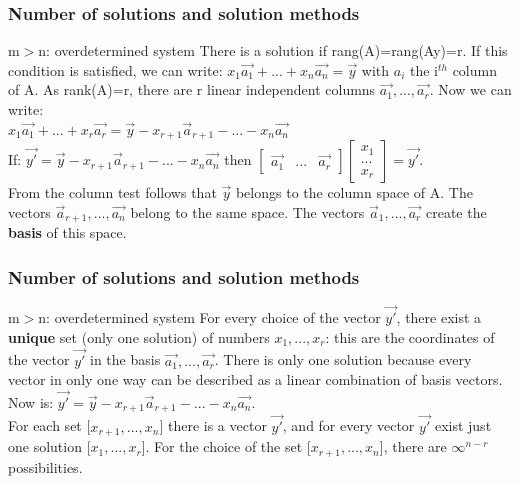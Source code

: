 \begin{frame}
	\frametitle{Number of solutions and solution methods}
	\begin{block}{m$>$n: overdetermined system}
		There is a solution if rang(A)=rang(Ay)=r. If this condition is satisfied, we can write: $x_1\overrightarrow{a_1}+...+x_n\overrightarrow{a_n}=\overrightarrow{y}$ with $a_i$ the i$^{th}$ column of A. As rank(A)=r, there are r linear independent columns
		$\overrightarrow{a_1},..., \overrightarrow{a_r}$. Now we can write: \\
		$x_1\overrightarrow{a_1}+...+x_r\overrightarrow{a_r}=\overrightarrow{y}-x_{r+1}\overrightarrow{a}_{r+1}-...-x_n\overrightarrow{a_n}$\\
		If: $\overrightarrow{y'}=\overrightarrow{y}-x_{r+1}\overrightarrow{a}_{r+1}-...-x_n\overrightarrow{a_n}$ then $\begin{bmatrix}
		\overrightarrow{a_1} & ... & \overrightarrow{a_r}
		\end{bmatrix} \begin{bmatrix}
		x_1\\...\\x_r
		\end{bmatrix}=\overrightarrow{y'}$. \\
		From the column test follows that $\overrightarrow{y}$ belongs to the column space of A. The vectors $\overrightarrow{a}_{r+1},...,\overrightarrow{a_n}$ belong to the same space. The vectors $\overrightarrow{a}_{1},...,\overrightarrow{a_r}$ create the \textbf{basis} of this space.
	\end{block}
\end{frame}

\begin{frame}
	\frametitle{Number of solutions and solution methods}
	\begin{block}{m$>$n: overdetermined system}
		For every choice of the vector $\overrightarrow{y'}$, there exist a \textbf{unique} set (only one solution) of numbers $x_1,...,x_r$: this are the coordinates of the vector $\overrightarrow{y'}$ in the basis $\overrightarrow{a_1},...,\overrightarrow{a_r}$. There is only one solution because every vector in only one way can be described as a linear combination of basis vectors. \\
		Now is: $\overrightarrow{y'}=\overrightarrow{y}-x_{r+1}\overrightarrow{a}_{r+1}-...-x_n\overrightarrow{a_n}$. \\
		For each set [$x_{r+1},...,x_{n}$] there is a vector $\overrightarrow{y'}$, and for every vector $\overrightarrow{y'}$ exist just one solution [$x_1,...,x_r$]. For the choice of the set [$x_{r+1},...,x_{n}$], there are $\infty ^{n-r}$ possibilities.
	\end{block}
\end{frame}


